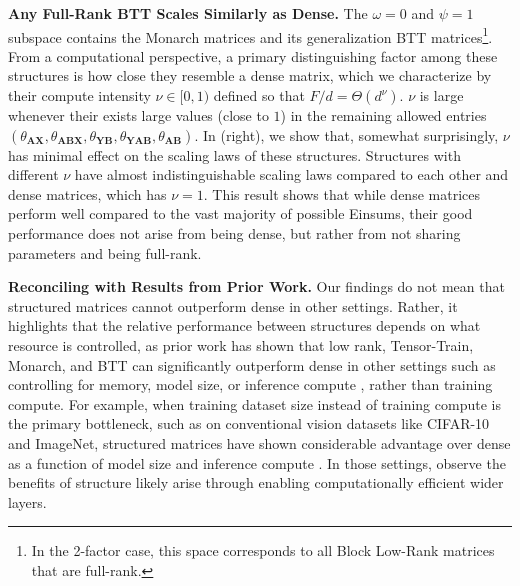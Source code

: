 \documentclass{article}
\newcommand{\mbf}[1]{{\boldsymbol{\mathbf{#1}}}}
\newcommand{\bm}{\mbf}
\begin{document}
\noindent \textbf{Any Full-Rank BTT Scales Similarly as Dense.} \quad
The $\omega=0$ and $\psi=1$ subspace contains the Monarch matrices and its generalization BTT matrices\footnote{In the 2-factor case, this space corresponds to all Block Low-Rank \citep{amestoy2015improving} matrices that are full-rank.}. From a computational perspective, a primary distinguishing factor among these structures is how close they resemble a dense matrix, which we characterize by their compute intensity $\nu \in [0, 1)$ defined so that $F/d = \Theta(d^{\nu}).$ $\nu$ is large whenever their exists large values (close to $1$) in the remaining allowed entries $(\theta_\bm{AX}, \theta_\bm{ABX}, \theta_\bm{YB}, \theta_\bm{YAB}, \theta_\bm{AB}).$ In  (right), we show that, somewhat surprisingly, $\nu$ has minimal effect on the scaling laws of these structures. Structures with different $\nu$ have almost indistinguishable scaling laws compared to each other and dense matrices, which has $\nu = 1$. This result shows that while dense matrices perform well compared to the vast majority of possible Einsums, their good performance does not arise from being dense, but rather from not sharing parameters and being full-rank.

\noindent \textbf{Reconciling with Results from Prior Work.} \quad
Our findings do not mean that structured matrices cannot outperform dense in other settings. Rather, it highlights that the relative performance between structures depends on what resource is controlled, as prior work has shown that low rank, Tensor-Train, Monarch, and BTT can significantly outperform dense in other settings such as controlling for memory, model size, or inference compute \citep{dao2019butterfly,dao2022monarch,zhao2016tensor,oseledets2011tt,qiu2024compute,lialin2023relora}, rather than training compute. For example, when training dataset size instead of training compute is the primary bottleneck, such as on conventional vision datasets like CIFAR-10 and ImageNet, structured matrices have shown considerable advantage over dense as a function of model size and inference compute \citep{dao2022monarch,qiu2024compute,lee2023differentiable}. In those settings, \citet{qiu2024compute} observe the benefits of structure likely arise through enabling computationally efficient wider layers.
\end{document}
